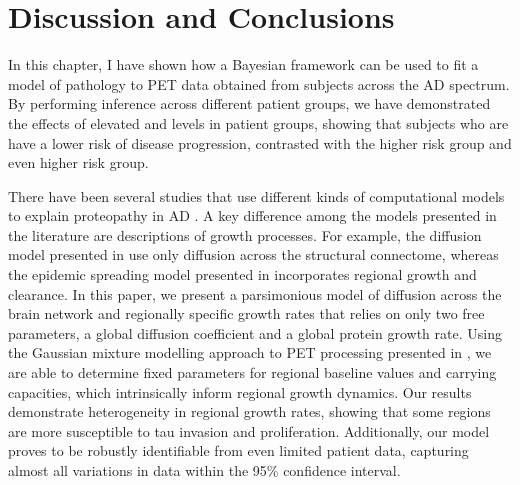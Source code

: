 \section{Discussion and Conclusions}

In this chapter, I have shown how a Bayesian framework can be used to fit a model
of \TP pathology to \TP PET data obtained from subjects across the AD spectrum.
By performing inference across different patient
groups, we have demonstrated the effects of elevated \AB and \TP levels in
patient groups, showing that subjects who are \ABN have a lower risk of disease
progression, contrasted with the higher risk group \ABP \TPN and even higher
risk \ABP \TPP group.

There have been several studies that use different kinds of computational models
to explain proteopathy in AD \cite{raj2015network, vogel2020spread}. A key
difference among the models presented in the literature are descriptions of
growth processes. For example, the diffusion model presented in
\cite{raj2012network,raj2015network} use only diffusion across the structural
connectome, whereas the epidemic spreading model presented in
\cite{iturria2014epidemic} incorporates regional growth and clearance. In this
paper, we present a parsimonious model of diffusion across the brain network and
regionally specific growth rates that relies on only two free parameters, a
global diffusion coefficient and a global protein growth rate. Using the
Gaussian mixture modelling approach to \TP PET processing presented in
\cite{vogel2020spread}, we are able to determine fixed parameters for regional
baseline values and carrying capacities, which intrinsically inform regional
growth dynamics. Our results demonstrate heterogeneity in regional growth rates,
showing that some regions are more susceptible to tau invasion and
proliferation. Additionally, our model proves to be robustly identifiable from
even limited patient data, capturing almost all variations in data within the
95\% confidence interval. 

